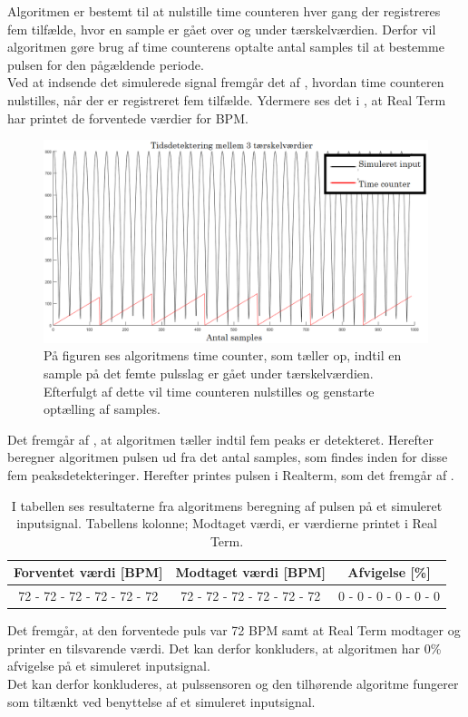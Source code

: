 Algoritmen er bestemt til at nulstille time counteren hver gang der registreres fem tilfælde, hvor en sample er gået over og under tærskelværdien. Derfor vil algoritmen gøre brug af time counterens optalte antal samples til at bestemme pulsen for den pågældende periode. \\
Ved at indsende det simulerede signal fremgår det af , hvordan time counteren nulstilles, når der er registreret fem tilfælde. Ydermere ses det i , at Real Term har printet de forventede værdier for BPM.
\begin{figure}[H]
	\centering
	\includegraphics[scale=0.34]{figures/cDesign/timecounter_puls_pic.png}
	\caption{På figuren ses algoritmens time counter, som tæller op, indtil en sample på det femte pulsslag er gået under tærskelværdien. Efterfulgt af dette vil time counteren nulstilles og genstarte optælling af samples.}
	\label{fig:timecounter_puls_realterm}
\end{figure}
Det fremgår af , at algoritmen tæller indtil fem peaks er detekteret. Herefter beregner algoritmen pulsen ud fra det antal samples, som findes inden for disse fem peaksdetekteringer. Herefter printes pulsen i Realterm, som det fremgår af .
\begin{table}[H]
	\centering
	\begin{tabular}{ccc}
		\hline
		\rowcolor[HTML]{C0C0C0} 
		Forventet værdi [BPM] & Modtaget værdi [BPM] & Afvigelse [\%]\\ \hline
		72 - 72 - 72 - 72 - 72 - 72         & 72 - 72 - 72 - 72 - 72 - 72         & 0 - 0 - 0 - 0 - 0 - 0 \\ \hline
	\end{tabular}
	\caption{I tabellen ses resultaterne fra algoritmens beregning af pulsen på et simuleret inputsignal. Tabellens kolonne; Modtaget værdi, er værdierne printet i Real Term.}
	\label{tab:test_puls_realterm}
\end{table} \vspace{-0.5cm}
Det fremgår, at den forventede puls var 72 BPM samt at Real Term modtager og printer en tilsvarende værdi. Det kan derfor konkluders, at algoritmen har 0\% afvigelse på et simuleret inputsignal. \\
Det kan derfor konkluderes, at pulssensoren og den tilhørende algoritme fungerer som tiltænkt ved benyttelse af et simuleret inputsignal. 


